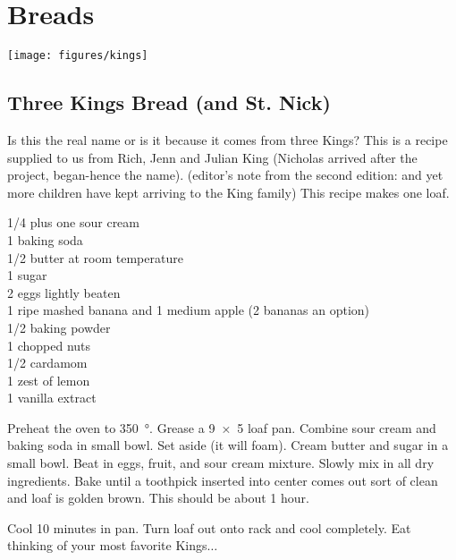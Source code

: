 \chapter{Breads}

\begin{center}
    \texttt{[image: figures/kings]}
\end{center}

\section{Three Kings Bread (and St. Nick)}

\begin{open}
  Is this the real name or is it because it comes from three Kings?
  This is a recipe supplied to us from Rich, Jenn and Julian King (Nicholas arrived after the project, began-hence the name). (editor's note from the second edition: and yet more children have kept arriving to the King family)
  This recipe makes one loaf.
\end{open}
\begin{ingredients}
  \SI{1/4}{\cup} plus one \si{\tblspoon} sour cream \\
  \SI{1}{\teaspoon} baking soda \\
  \SI{1/2}{\cup} butter at room temperature \\
  \SI{1}{\cup} sugar \\
  2 eggs lightly beaten \\
  1 ripe mashed banana and 1 medium apple (2 bananas an option) \\
  \SI{1/2}{\teaspoon} baking powder \\
  \SI{1}{\cup} chopped nuts \\
  \SI{1/2}{\teaspoon} cardamom \\
  1 zest of lemon \\
  \SI{1}{\teaspoon} vanilla extract
\end{ingredients}
Preheat the oven to \SI{350}{\degree}.  Grease a \SI{9x5}{\inch} loaf pan.
Combine sour cream and baking soda in small bowl.  Set aside (it will foam).
Cream butter and sugar in a small bowl.  Beat in eggs, fruit, and sour cream
mixture.  Slowly mix in all dry ingredients.  Bake until a toothpick inserted
into center comes out sort of clean and loaf is golden brown.  This should be
about 1 hour.

Cool 10 minutes in pan. Turn loaf out onto rack and cool completely.  Eat
thinking of your most favorite Kings$\ldots$

